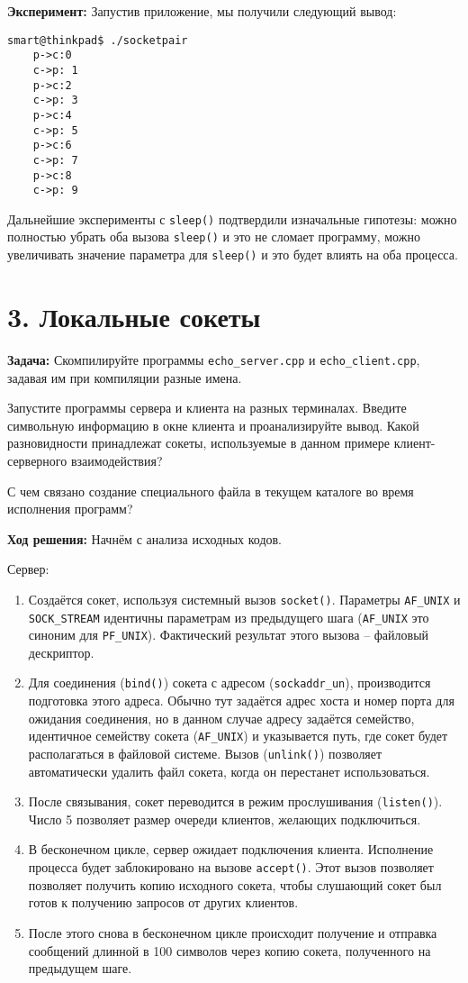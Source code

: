 \textbf{Эксперимент:} Запустив приложение, мы получили следующий вывод:
\begin{Verbatim}[frame=single,breaklines=true,breakanywhere=true]
    smart@thinkpad$ ./socketpair
    p->c:0
    c->p: 1
    p->c:2
    c->p: 3
    p->c:4
    c->p: 5
    p->c:6
    c->p: 7
    p->c:8
    c->p: 9
\end{Verbatim}

Дальнейшие эксперименты с \texttt{sleep()} подтвердили изначальные гипотезы: можно полностью убрать оба вызова \texttt{sleep()} и это не сломает программу, можно увеличивать значение параметра для \texttt{sleep()} и это будет влиять на оба процесса.

\section*{3. Локальные сокеты}
\textbf{Задача:} Скомпилируйте программы \texttt{echo\_server.cpp} и \texttt{echo\_client.cpp}, задавая им при компиляции разные имена.

Запустите программы сервера и клиента на разных терминалах. Введите символьную информацию в окне клиента и проанализируйте вывод. Какой разновидности принадлежат сокеты, используемые в данном примере клиент-серверного взаимодействия?

С чем связано создание специального файла в текущем каталоге во время исполнения программ?

\textbf{Ход решения:} Начнём с анализа исходных кодов.

Сервер:
\begin{enumerate}
\item Создаётся сокет, используя системный вызов \texttt{socket()}. Параметры \texttt{AF\_UNIX} и \texttt{SOCK\_STREAM} идентичны параметрам из предыдущего шага (\texttt{AF\_UNIX} это синоним для \texttt{PF\_UNIX}). Фактический результат этого вызова -- файловый дескриптор.
\item Для соединения (\texttt{bind()}) сокета с адресом (\texttt{sockaddr\_un}), производится подготовка этого адреса. Обычно тут задаётся адрес хоста и номер порта для ожидания соединения, но в данном случае адресу задаётся семейство, идентичное семейству сокета (\texttt{AF\_UNIX}) и указывается путь, где сокет будет располагаться в файловой системе. Вызов (\texttt{unlink()}) позволяет автоматически удалить файл сокета, когда он перестанет использоваться.
\item После связывания, сокет переводится в режим прослушивания (\texttt{listen()}). Число 5 позволяет размер очереди клиентов, желающих подключиться.
\item В бесконечном цикле, сервер ожидает подключения клиента. Исполнение процесса будет заблокировано на вызове \texttt{accept()}. Этот вызов позволяет позволяет получить копию исходного сокета, чтобы слушающий сокет был готов к получению запросов от других клиентов.
\item После этого снова в бесконечном цикле происходит получение и отправка сообщений длинной в 100 символов через копию сокета, полученного на предыдущем шаге.
\end{enumerate}


